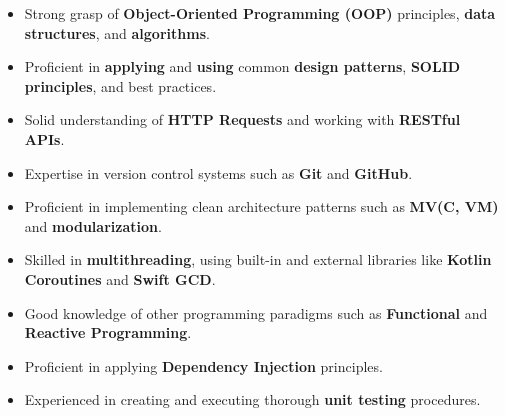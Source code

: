 \documentclass[10pt,a4paper,ragged2e,withhyper]{altacv}
\begin{document}
    {\large\begin{itemize}
               \item Strong grasp of \textbf{Object-Oriented Programming (OOP)} principles, \textbf{data structures}, and \textbf{algorithms}.
               \item Proficient in \textbf{applying} and \textbf{using} common \textbf{design patterns}, \textbf{SOLID principles}, and best practices.
               \item Solid understanding of \textbf{HTTP Requests} and working with \textbf{RESTful APIs}.
               \item Expertise in version control systems such as \textbf{Git} and \textbf{GitHub}.
               \item Proficient in implementing clean architecture patterns such as \textbf{MV(C, VM)} and \textbf{modularization}.
               \item Skilled in \textbf{multithreading}, using built-in and external libraries like \textbf{Kotlin Coroutines} and \textbf{Swift GCD}.
               \item Good knowledge of other programming paradigms such as \textbf{Functional} and \textbf{Reactive Programming}.
               \item Proficient in applying \textbf{Dependency Injection} principles.
               \item Experienced in creating and executing thorough \textbf{unit testing} procedures.
    \end{itemize}}


\end{document}
